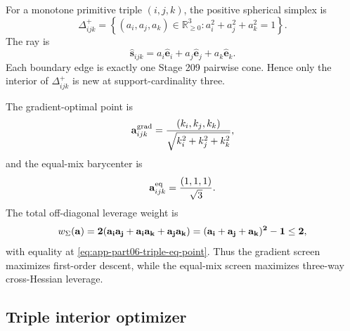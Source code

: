 For a monotone primitive triple \((i,j,k)\), the positive spherical simplex is
\begin{equation}
\label{eq:app-part06-triple-simplex}
\Delta_{ijk}^{+}
=
\left\{(a_i,a_j,a_k)\in\mathbb R_{\ge0}^{3}:a_i^2+a_j^2+a_k^2=1\right\}.
\end{equation}
The ray is
\begin{equation}
\label{eq:app-part06-triple-ray}
\widehat{\mathbf s}_{ijk}=a_i\widehat{\mathbf e}_i+a_j\widehat{\mathbf e}_j+a_k\widehat{\mathbf e}_k.
\end{equation}
Each boundary edge is exactly one Stage 209 pairwise cone.  Hence only the interior of \(\Delta_{ijk}^{+}\) is new at support-cardinality three.

The gradient-optimal point is
\begin{equation}
\label{eq:app-part06-triple-grad-point}
\mathbf a_{ijk}^{\rm grad}
=
\frac{(k_i,k_j,k_k)}{\sqrt{k_i^2+k_j^2+k_k^2}},
\end{equation}
and the equal-mix barycenter is
\begin{equation}
\label{eq:app-part06-triple-eq-point}
\mathbf a_{ijk}^{\rm eq}=\frac{(1,1,1)}{\sqrt3}.
\end{equation}
The total off-diagonal leverage weight is
\begin{equation}
\label{eq:app-part06-triple-cross-leverage}
w_\Sigma(\bf a)=2(a_ia_j+a_ia_k+a_ja_k)=(a_i+a_j+a_k)^2-1\le2,
\end{equation}
with equality at \eqref{eq:app-part06-triple-eq-point}.  Thus the gradient screen maximizes first-order descent, while the equal-mix screen maximizes three-way cross-Hessian leverage.

\subsection{Triple interior optimizer}
\label{subsec:app-part06-triple-interior-optimizer}

